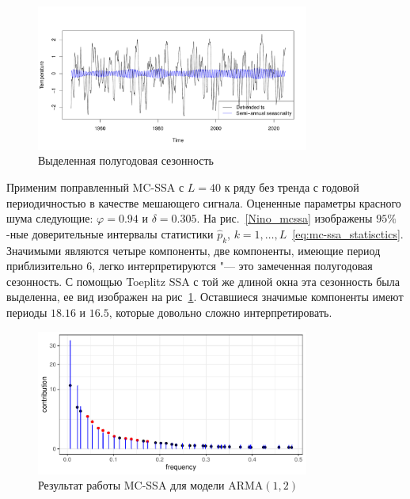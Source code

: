 \documentclass[specialist,
substylefile = spbu_report.rtx,
subf,href,colorlinks=true, 12pt]{disser}
\theoremstyle{definition}
\begin{document}
\begin{figure}
	\centering
	\includegraphics[width=0.8\textwidth]{img/Nino_reconstruct_semi_annual.pdf}
	\caption{Выделенная полугодовая сезонность}
	\label{Nino_reconstruct_semi_annual}
\end{figure}

Применим поправленный MC-SSA с $L=40$ к ряду без тренда с годовой периодичностью в качестве мешающего сигнала. Оцененные параметры красного шума следующие: $\varphi=0.94$ и $\delta=0.305$. На рис.~\ref{Nino_mcssa} изображены $95\%$-ные доверительные интервалы статистики $\hat p_k$, $k=1,\ldots,L$~\eqref{eq:mc-ssa_statisctics}. Значимыми являются четыре компоненты, две компоненты, имеющие период приблизительно $6$, легко интерпретируются "---  это замеченная полугодовая сезонность. С помощью Toeplitz SSA с той же длиной окна эта сезонность была выделенна, ее вид изображен на рис~\ref{Nino_reconstruct_semi_annual}. Оставшиеся значимые компоненты имеют периоды $18.16$ и $16.5$, которые довольно сложно интерпретировать.
\begin{figure}
	\centering
	\includegraphics[width=0.8\textwidth]{img/Nino_mcssa_arma12.pdf}
	\caption{Результат работы MC-SSA для модели ARMA$(1,2)$}
	\label{Nino_mcssa_arma12}
\end{figure}
\end{document}
